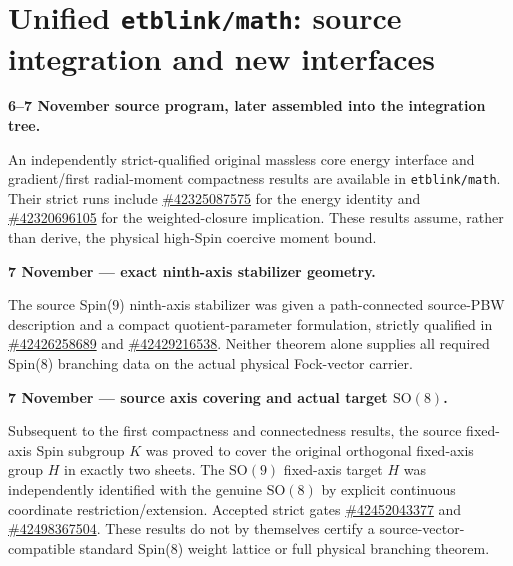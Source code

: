 \section{Unified \texttt{etblink/math}: source integration and new interfaces}

\par\medskip\noindent\textbf{6--7 November source program, later assembled into the integration tree.}\par\smallskip
An independently strict-qualified original massless core energy interface
and gradient/first radial-moment compactness results are available in
\texttt{etblink/math}. Their strict runs include
\href{https://github.com/etblink/math/actions/runs/42325087575}{\#42325087575}
for the energy identity and
\href{https://github.com/etblink/math/actions/runs/42320696105}{\#42320696105}
for the weighted-closure implication. These results assume, rather
than derive, the physical high-Spin coercive moment bound.

\par\medskip\noindent\textbf{7 November --- exact ninth-axis stabilizer geometry.}\par\smallskip
The source Spin(9) ninth-axis stabilizer was given a path-connected
source-PBW description and a compact quotient-parameter formulation,
strictly qualified in
\href{https://github.com/etblink/math/actions/runs/42426258689}{\#42426258689}
and
\href{https://github.com/etblink/math/actions/runs/42429216538}{\#42429216538}.
Neither theorem alone supplies all required Spin(8) branching data
on the actual physical Fock-vector carrier.

\par\medskip\noindent\textbf{7 November --- source axis covering and actual target $\mathrm{SO}(8)$.}\par\smallskip
Subsequent to the first compactness and connectedness results, the source
fixed-axis Spin subgroup $K$ was proved to cover the original orthogonal
fixed-axis group $H$ in exactly two sheets. The $\mathrm{SO}(9)$
fixed-axis target $H$ was independently identified with the genuine
$\mathrm{SO}(8)$ by explicit continuous coordinate restriction/extension.
Accepted strict gates
\href{https://github.com/etblink/math/actions/runs/42452043377}{\#42452043377}
and
\href{https://github.com/etblink/math/actions/runs/42498367504}{\#42498367504}.
These results do not by themselves certify a source-vector-compatible
standard Spin(8) weight lattice or full physical branching theorem.

